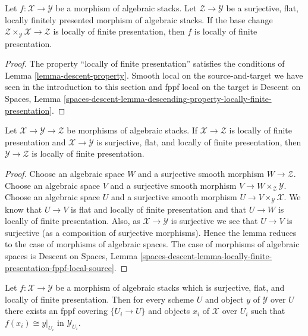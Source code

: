 \begin{lemma}
\label{lemma-descent-finite-presentation}
Let $f : \mathcal{X} \to \mathcal{Y}$ be a morphism of algebraic stacks.
Let $\mathcal{Z} \to \mathcal{Y}$ be a surjective, flat, locally finitely
presented morphism of algebraic stacks. If the base change
$\mathcal{Z} \times_\mathcal{Y} \mathcal{X} \to \mathcal{Z}$
is locally of finite presentation, then $f$ is locally of finite
presentation.
\end{lemma}

\begin{proof}
The property
``locally of finite presentation''
satisfies the conditions of Lemma \ref{lemma-descent-property}.
Smooth local on the source-and-target we have seen in the
introduction to this section and fppf local on the target is
Descent on Spaces, Lemma
\ref{spaces-descent-lemma-descending-property-locally-finite-presentation}.
\end{proof}

\begin{lemma}
\label{lemma-flat-finite-presentation-permanence}
Let $\mathcal{X} \to \mathcal{Y} \to \mathcal{Z}$ be morphisms of
algebraic stacks. If $\mathcal{X} \to \mathcal{Z}$ is locally of finite
presentation and $\mathcal{X} \to \mathcal{Y}$ is surjective, flat, and
locally of finite presentation, then $\mathcal{Y} \to \mathcal{Z}$
is locally of finite presentation.
\end{lemma}

\begin{proof}
Choose an algebraic space $W$ and a surjective smooth morphism
$W \to \mathcal{Z}$. Choose an algebraic space $V$ and a surjective smooth
morphism $V \to W \times_\mathcal{Z} \mathcal{Y}$. Choose an algebraic space
$U$ and a surjective smooth morphism $U \to V \times_\mathcal{Y} \mathcal{X}$.
We know that $U \to V$ is flat and locally of finite presentation
and that $U \to W$ is locally of finite presentation.
Also, as $\mathcal{X} \to \mathcal{Y}$ is surjective we see that
$U \to V$ is surjective (as a composition of surjective morphisms).
Hence the lemma reduces to the case of morphisms of algebraic spaces.
The case of morphisms of algebraic spaces is
Descent on Spaces, Lemma
\ref{spaces-descent-lemma-locally-finite-presentation-fppf-local-source}.
\end{proof}

\begin{lemma}
\label{lemma-surjective-flat-locally-finite-presentation}
Let $f : \mathcal{X} \to \mathcal{Y}$ be a morphism of algebraic stacks
which is surjective, flat, and locally of finite presentation.
Then for every scheme $U$ and object $y$ of $\mathcal{Y}$ over $U$
there exists an fppf covering $\{U_i \to U\}$ and objects $x_i$
of $\mathcal{X}$ over $U_i$ such that $f(x_i) \cong y|_{U_i}$ in
$\mathcal{Y}_{U_i}$.
\end{lemma}

